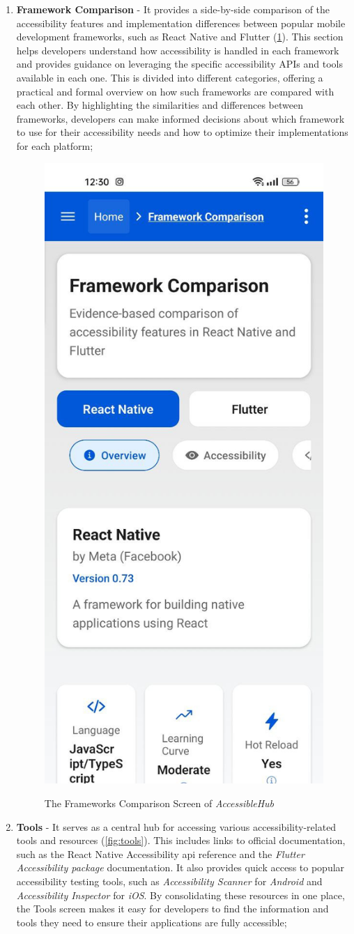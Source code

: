 \begin{enumerate}
\pagebreak

\item \textbf{Framework Comparison} - It provides a side-by-side comparison of the accessibility features and implementation differences between popular mobile development frameworks, such as React Native and Flutter (\ref{fig:frameworks-comparison}). This section helps developers understand how accessibility is handled in each framework and provides guidance on leveraging the specific accessibility APIs and tools available in each one. This is divided into different categories, offering a practical and formal overview on how such frameworks are compared with each other. By highlighting the similarities and differences between frameworks, developers can make informed decisions about which framework to use for their accessibility needs and how to optimize their implementations for each platform;

\begin{figure}[ht]
\centering
\includegraphics[width=0.4\linewidth, alt={Screenshot of the Frameworks Comparison Screen of AccessibleHub}]{img/frameworks-comparison.jpg}
\caption{The Frameworks Comparison Screen of \textit{AccessibleHub}}\label{fig:frameworks-comparison}
\end{figure}

\pagebreak

\item \textbf{Tools} - It serves as a central hub for accessing various accessibility-related tools and resources (\ref{fig:tools}). This includes links to official documentation, such as the React Native Accessibility \acrshort{api} reference and the \textit{Flutter Accessibility package} documentation. It also provides quick access to popular accessibility testing tools, such as \textit{Accessibility Scanner} for \textit{Android} and \textit{Accessibility Inspector} for \textit{iOS}. By consolidating these resources in one place, the Tools screen makes it easy for developers to find the information and tools they need to ensure their applications are fully accessible; 


\end{enumerate}
